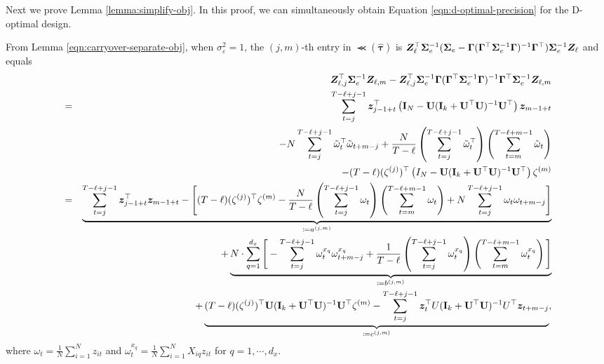     
    
    
    Next we prove Lemma \ref{lemma:simplify-obj}. In this proof, we can simultaneously obtain Equation \eqref{eqn:d-optimal-precision} for the D-optimal design.
    
     \texttt{} 
		
		From Lemma \ref{eqn:carryover-separate-obj}, when $\sigma_\varepsilon^2 = 1$, the $(j,m)$-th entry in $\Prec(\hat{\bm{\tau}})$ is $ \bm{Z}_\ell^\top  \bm{\Sigma}^{-1}_e  ( \bm{\Sigma}_e - \bm{\Gamma} (\bm{\Gamma}^\top \bm{\Sigma}^{-1}_e  \bm{\Gamma})^{-1} \bm{\Gamma}^\top) \bm{\Sigma}^{-1}_e  \bm{Z}_\ell$ and equals
		\begin{eqnarray*}
			&& \bm{Z}_{\ell,j}^\top  \bm{\Sigma}_e^{-1} \bm{Z}_{\ell,m} - \bm{Z}_{\ell,j}^\top \bm{\Sigma}_e^{-1} \bm{\Gamma} (\bm{\Gamma}^\top \bm{\Sigma}_e^{-1} \bm{\Gamma})^{-1} \bm{\Gamma}^\top \bm{\Sigma}_e^{-1} \bm{Z}_{\ell,m}  \\
			&=& \sum_{t=j}^{T - \ell+j-1} \bm{z}_{j-1+t}^\top \left( \mathbf{I}_N - \mathbf{U}(\mathbf{I}_k + \mathbf{U}^\top \mathbf{U})^{-1} \mathbf{U}^\top  \right) \bm{z}_{m-1+t} \\
			&& - N \sum_{t=j}^{T - \ell+j-1} \tilde \omega_t^\top \tilde \omega_{t+m-j} +  \frac{N}{T - \ell}  \left( \sum_{t=j}^{T - \ell+j-1} \tilde \omega_t^\top  \right)  \left( \sum_{t=m}^{T - \ell+m-1} \tilde \omega_t \right)  \\ &&  - (T - \ell)  (\zeta^{(j)})^\top \left( I_N - \mathbf{U} (\mathbf{I}_k + \mathbf{U}^\top \mathbf{U})^{-1} \mathbf{U}^\top \right) \zeta^{(m)} \\
			&=& \underbrace{\sum_{t=j}^{T - \ell+j-1} \bm{z}_{j-1+t}^\top \bm{z}_{m-1+t}  - \Bigg[ (T - \ell)  (\zeta^{(j)})^\top    \zeta^{(m)}   -  \frac{N}{T - \ell}  \left( \sum_{t=j}^{T - \ell+j-1} \omega_t  \right)  \left( \sum_{t=m}^{T - \ell+m-1} \omega_t \right) + N \sum_{t=j}^{T - \ell+j-1} \omega_t \omega_{t+m-j}  \Bigg] }_{\coloneqq a^{(j,m)}} \\
			&& + \underbrace{N \cdot  \sum_{q=1}^{d_x} \Bigg[  -\sum_{t=j}^{T - \ell+j-1} \omega_t^{x_q} \omega^{x_q}_{t+m-j}   + \frac{1}{T - \ell}  \left( \sum_{t=j}^{T - \ell+j-1} \omega^{x_q}_t  \right)  \left( \sum_{t=m}^{T - \ell+m-1} \omega^{x_q}_t \right)  \Bigg] }_{\coloneqq b^{(j,m)}} \\
			&& + \underbrace{(T - \ell)  (\zeta^{(j)})^\top  \mathbf{U} (\mathbf{I}_k + \mathbf{U}^\top \mathbf{U})^{-1} \mathbf{U}^\top  \zeta^{(m)}  - \sum_{t=j}^{T - \ell+j-1} \bm{z}_t^\top U (\mathbf{I}_k +  \mathbf{U}^\top \mathbf{U})^{-1} U^\top \bm{z}_{t+m-j}  }_{\coloneqq c^{(j,m)}},   
		\end{eqnarray*}
		where $\omega_t = \frac{1}{N} \sum_{i = 1}^N z_{it}$ and $\omega_t^{x_q} = \frac{1}{N} \sum_{i = 1}^N X_{iq} z_{it}$ for $q = 1, \cdots, d_x$. 
		

